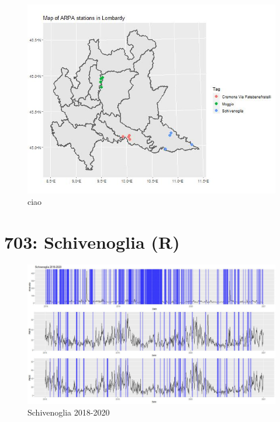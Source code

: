 \documentclass{article}
\begin{document}
\begin{figure}[H]
  \centering
  \includegraphics[scale = 0.45]{Picture/WStationsOfInterest.jpeg}
  \caption{ciao}
\end{figure}

\section{703: Schivenoglia (R)}
\begin{figure}[H]
  \centering
  \includegraphics[scale = 0.45]{Picture/Schivenoglia 2018-2020.jpeg}
  \caption{Schivenoglia 2018-2020}
  \centering
\end{figure}
\end{document}
